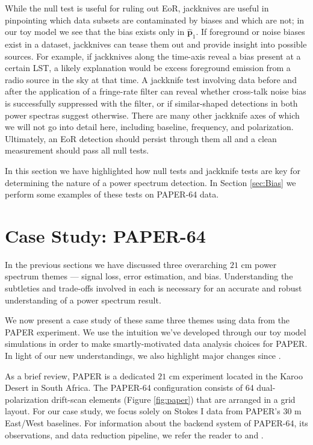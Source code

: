 \documentclass[preprint2,numberedappendix,tighten]{aastex6}  %
\begin{document}
While the null test is useful for ruling out EoR, jackknives are useful in pinpointing which data subsets are contaminated by biases and which are not; in our toy model we see that the bias exists only in $\hat{\textbf{p}}_{1}$. If foreground or noise biases exist in a dataset, jackknives can tease them out and provide insight into possible sources. For example, if jackknives along the time-axis reveal a bias present at a certain LST, a likely explanation would be excess foreground emission from a radio source in the sky at that time. A jackknife test involving data before and after the application of a fringe-rate filter can reveal whether cross-talk noise bias is successfully suppressed with the filter, or if similar-shaped detections in both power spectras suggest otherwise. There are many other jackknife axes of which we will not go into detail here, including baseline, frequency, and polarization. Ultimately, an EoR detection should persist through them all and a clean measurement should pass all null tests. 

In this section we have highlighted how null tests and jackknife tests are key for determining the nature of a power spectrum detection. In Section \ref{sec:Bias} we perform some examples of these tests on PAPER-64 data.

\section{Case Study: PAPER-64}
\label{sec:CaseStudy}

In the previous sections we have discussed three overarching $21$ cm power spectrum themes --- signal loss, error estimation, and bias. Understanding the subtleties and trade-offs involved in each is necessary for an accurate and robust understanding of a power spectrum result. 

We now present a case study of these same three themes using data from the PAPER experiment. We use the intuition we've developed through our toy model simulations in order to make smartly-motivated data analysis choices for PAPER. In light of our new understandings, we also highlight major changes since \citet{ali_et_al2015}.

As a brief review, PAPER is a dedicated $21$ cm experiment located in the Karoo Desert in South Africa. The PAPER-64 configuration consists of 64 dual-polarization drift-scan elements (Figure \ref{fig:paper}) that are arranged in a grid layout. For our case study, we focus solely on Stokes I data from PAPER's $30$ m East/West baselines. For information about the backend system of PAPER-64, its observations, and data reduction pipeline, we refer the reader to \citet{parsons_et_al2010} and \citet{ali_et_al2015}.
\end{document}
